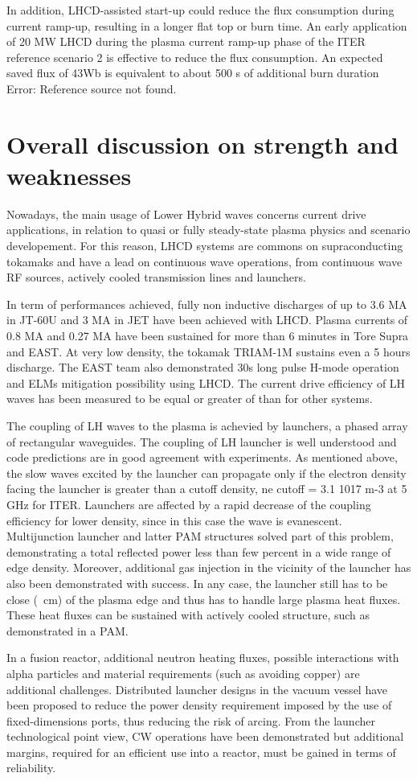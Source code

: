 In addition, LHCD-assisted start-up could reduce the flux consumption during current ramp-up, resulting in a longer flat top or burn time. An early application of 20 MW LHCD during the plasma current ramp-up phase of the ITER reference scenario 2 is effective to reduce the flux consumption. An expected saved flux of 43Wb is equivalent to about 500 s of additional burn duration Error: Reference source not found.

\section{Overall discussion on strength and weaknesses}
Nowadays, the main usage of Lower Hybrid waves concerns current drive applications, in relation to quasi or fully steady-state plasma physics and scenario developement. For this reason, LHCD systems are commons on supraconducting tokamaks and have a lead on continuous wave operations, from continuous wave RF sources, actively cooled transmission lines and launchers.  

In term of performances achieved, fully non inductive discharges of up to 3.6 MA in JT-60U and 3 MA in JET have been achieved with LHCD. Plasma currents of 0.8 MA and 0.27 MA have been sustained for more than 6 minutes in Tore Supra and EAST. At very low density, the tokamak TRIAM-1M sustains even a 5 hours discharge. The EAST team also demonstrated 30s long pulse H-mode operation and ELMs mitigation possibility using LHCD. The current drive efficiency of LH waves has been measured to be equal or greater of than for other systems.

The coupling of LH waves to the plasma is achevied by launchers, a phased array of rectangular waveguides. The coupling of LH launcher is well understood and code predictions are in good agreement with experiments. As mentioned above, the slow waves excited by the launcher can propagate only if the electron density facing the launcher is greater than a cutoff density, ne cutoff = 3.1 1017 m-3 at 5 GHz for ITER. Launchers are affected by a rapid decrease of the coupling efficiency for lower density, since in this case the wave is evanescent. Multijunction launcher and latter PAM structures solved part of this problem, demonstrating a total reflected power less than few percent in a wide range of edge density. Moreover, additional gas injection in the vicinity of the launcher has also been demonstrated with success. In any case, the launcher still has to be close (~cm) of the plasma edge and thus has to handle large plasma heat fluxes. These heat fluxes can be sustained with actively cooled structure, such as demonstrated in a PAM. 

In a fusion reactor, additional neutron heating fluxes, possible interactions with alpha particles and material requirements (such as avoiding copper) are additional challenges. Distributed launcher designs in the vacuum vessel have been proposed to reduce the power density requirement imposed by the use of fixed-dimensions ports, thus reducing the risk of arcing. From the launcher technological point view, CW operations have been demonstrated but additional margins, required for an efficient use into a reactor, must be gained in terms of reliability. 




